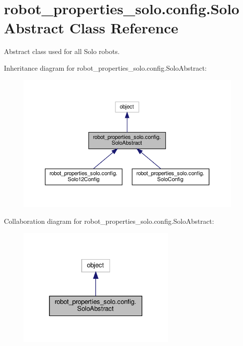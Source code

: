\hypertarget{classrobot__properties__solo_1_1config_1_1SoloAbstract}{}\section{robot\+\_\+properties\+\_\+solo.\+config.\+Solo\+Abstract Class Reference}
\label{classrobot__properties__solo_1_1config_1_1SoloAbstract}


Abstract class used for all Solo robots.  




Inheritance diagram for robot\+\_\+properties\+\_\+solo.\+config.\+Solo\+Abstract\+:
\nopagebreak
\begin{figure}[H]
\begin{center}
\leavevmode
\includegraphics[width=350pt]{classrobot__properties__solo_1_1config_1_1SoloAbstract__inherit__graph}
\end{center}
\end{figure}


Collaboration diagram for robot\+\_\+properties\+\_\+solo.\+config.\+Solo\+Abstract\+:
\nopagebreak
\begin{figure}[H]
\begin{center}
\leavevmode
\includegraphics[width=222pt]{classrobot__properties__solo_1_1config_1_1SoloAbstract__coll__graph}
\end{center}
\end{figure}
